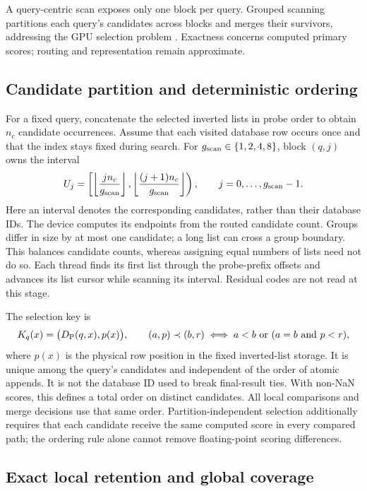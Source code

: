 A query-centric scan exposes only one block per query. Grouped scanning
partitions each query's candidates across blocks and merges their
survivors, addressing the GPU selection problem \cite{johnson_gpu}.
Exactness concerns computed primary scores; routing and representation
remain approximate.

\subsection{Candidate partition and deterministic ordering}

For a fixed query, concatenate the selected inverted lists in probe order
to obtain $n_c$ candidate occurrences. Assume that each visited database
row occurs once and that the index stays fixed during search. For
$g_{\mathrm{scan}}\in\{1,2,4,8\}$, block $(q,j)$ owns the interval
\begin{equation}
 U_j=\left[\left\lfloor\frac{j n_c}{g_{\mathrm{scan}}}\right\rfloor,
              \left\lfloor\frac{(j+1)n_c}{g_{\mathrm{scan}}}\right\rfloor\right),
 \qquad j=0,\ldots,g_{\mathrm{scan}}-1.
 \label{eq:5-partition}
\end{equation}
Here an interval denotes the corresponding candidates, rather than their
database IDs. The device computes its endpoints from the routed candidate
count. Groups differ in size by at most one candidate; a long list can
cross a group boundary. This balances candidate counts, whereas assigning
equal numbers of lists need not do so. Each thread finds its first list
through the probe-prefix offsets and advances its list cursor while
scanning its interval. Residual codes are not read at this stage.

The selection key is
\begin{equation}
 K_q(x)=\bigl(D_{\mathrm{P}}(q,x),p(x)\bigr),
 \qquad
 (a,p)\prec(b,r)\iff a<b\ \text{or}\ (a=b\ \text{and}\ p<r),
 \label{eq:5-primary-key}
\end{equation}
where $p(x)$ is the physical row position in the fixed inverted-list
storage. It is unique among the query's candidates and independent of
the order of atomic appends. It is not the database ID used to break
final-result ties. With non-NaN scores, this defines a total order on
distinct candidates. All local comparisons and merge decisions use that
same order. Partition-independent selection additionally requires that
each candidate receive the same computed score in every compared path;
the ordering rule alone cannot remove floating-point scoring differences.

\subsection{Exact local retention and global coverage}

